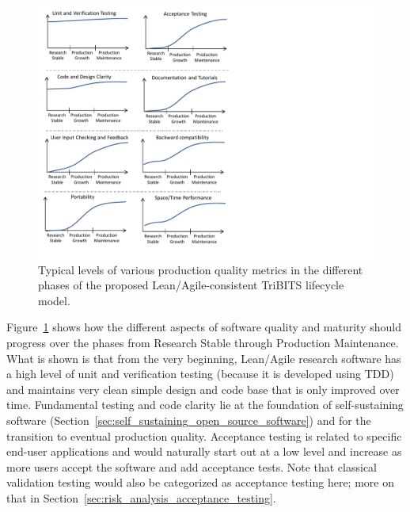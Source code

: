 \documentclass[11pt]{SANDreport}
\begin{document}
\begin{figure}
\begin{center}
\includegraphics[trim = 0.1in 0.1in 4.0in 0.1in, scale=0.85]
{ImprovementsInDevelopmentPhases}
{}\caption{Typical levels of various production quality metrics in the
different phases of the proposed Lean/Agile-consistent TriBITS
lifecycle model.}
\label{fig:ImprovementsInDevelopmentPhases}
\end{center}
\end{figure}

Figure~\ref{fig:ImprovementsInDevelopmentPhases} shows how the
different aspects of software quality and maturity should progress
over the phases from Research Stable through Production
Maintenance.  What is shown is that from the very beginning,
Lean/Agile research software has a high level of unit and verification
testing (because it is developed using TDD) and maintains very clean
simple design and code base that is only improved over time.
Fundamental testing and code clarity lie at the foundation of
self-sustaining software
(Section~\ref{sec:self_sustaining_open_source_software}) and for the
transition to eventual production quality.  Acceptance testing is
related to specific end-user applications and would naturally start
out at a low level and increase as more users accept the
software and add acceptance tests.  Note that classical validation
testing would also be categorized as acceptance testing here; more on
that in Section~\ref{sec:risk_analysis_acceptance_testing}.
\end{document}
